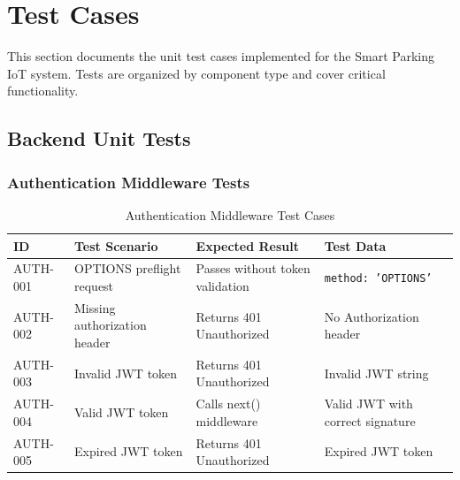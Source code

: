 \section{Test Cases}

This section documents the unit test cases implemented for the Smart Parking IoT system. Tests are organized by component type and cover critical functionality.

\subsection{Backend Unit Tests}

\subsubsection{Authentication Middleware Tests}
\begin{table}[H]
\centering
\small
\renewcommand{\arraystretch}{1.3}
\begin{tabularx}{\textwidth}{|l|>{\RaggedRight\arraybackslash}X|>{\RaggedRight\arraybackslash}X|>{\RaggedRight\arraybackslash}p{3.5cm}|}
\hline
\textbf{ID} & \textbf{Test Scenario} & \textbf{Expected Result} & \textbf{Test Data} \\
\hline
AUTH-001 & OPTIONS preflight request & Passes without token validation & \texttt{method: 'OPTIONS'} \\
\hline
AUTH-002 & Missing authorization header & Returns 401 Unauthorized & No Authorization header \\
\hline
AUTH-003 & Invalid JWT token & Returns 401 Unauthorized & Invalid JWT string \\
\hline
AUTH-004 & Valid JWT token & Calls next() middleware & Valid JWT with correct signature \\
\hline
AUTH-005 & Expired JWT token & Returns 401 Unauthorized & Expired JWT token \\
\hline
\end{tabularx}
\caption{Authentication Middleware Test Cases}
\label{tab:auth-middleware-tests}
\end{table}

